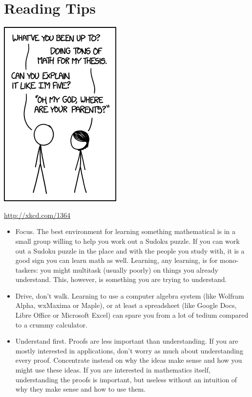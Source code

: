 \section*{Reading Tips}
\begin{marginfigure}
\begin{center}
\includegraphics{graphics/like_im_five.png}
\end{center}
\caption{\url{http://xkcd.com/1364}}
\label{fig:xkcd1364}
\end{marginfigure}
\begin{itemize}
\item Focus. The best environment for learning something mathematical is in a small group willing to help you work out a Sudoku puzzle.  If you can work out a Sudoku puzzle in the place and with the people you study with, it is a good sign you can learn math as well.  Learning, any learning, is for mono-taskers: you might multitask (usually poorly) on things you already understand.  This, however, is something you are trying to understand.
\item Drive, don't walk. Learning to use a computer algebra system (like Wolfram Alpha, wxMaxima or Maple), or at least a spreadsheet (like Google Docs, Libre Office or Microsoft Excel) can spare you from a lot of tedium compared to a crummy calculator.
\item Understand first. Proofs are less important than understanding.  If you are mostly interested in applications, don't worry as much about understanding every proof.  Concentrate instead on why the ideas make sense and how you might use these ideas.  If you are interested in mathematics itself, understanding the proofs is important, but useless without an intuition of why they make sense and how to use them.
\end{itemize}
